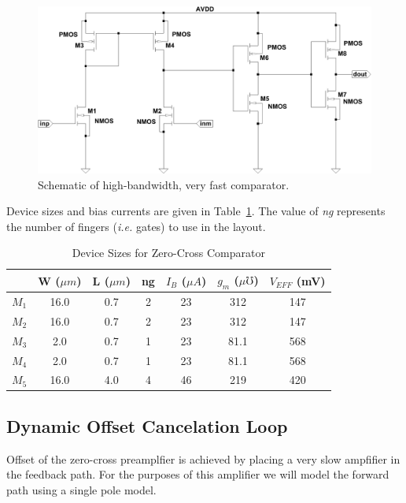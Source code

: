 \documentclass[12pt, onecolumn]{IEEEtran}
\begin{document}
\begin{figure}[htbp!]
	\centering
 	\includegraphics[scale=0.6,keepaspectratio=true]{./images/zc_cmp.pdf}
 	\caption{Schematic of high-bandwidth, very fast comparator.}
 	\label{FIG:ZC_CMP}
\end{figure}



Device sizes and bias currents are given in Table~\ref{TBL:ZC_CMP}. The value of \emph{ng} represents the number of fingers (\emph{i.e.} gates) to use in the layout.\\ 


\begin{table} [htbp!]
\begin{center}
\begin{tabular}{|c|c|c|c|c|c|c|}
\hline 
 & W ($\mu m$) & L ($\mu m$) & ng & $I_B$ ($\mu A$) & $g_m$ ($\mu \mho$) & $V_{EFF}$ (mV)\\ 
\hline 
$M_1$ & 16.0 & 0.7 & 2 & 23 & 312 & 147 \\ 
\hline 
$M_2$ & 16.0 & 0.7 & 2 & 23 & 312 & 147 \\ 
\hline 
$M_3$ & 2.0 & 0.7 & 1 & 23 & 81.1 & 568 \\ 
\hline 
$M_4$ & 2.0 & 0.7 & 1 & 23 & 81.1 & 568 \\ 
\hline 
$M_5$ & 16.0 & 4.0 & 4 & 46 & 219 & 420 \\ 
\hline 
\end{tabular} 
\end{center}
\caption{Device Sizes for Zero-Cross Comparator}
\label{TBL:ZC_CMP}
\end{table}


\subsection*{Dynamic Offset Cancelation Loop}


Offset of the zero-cross preamplfier is achieved by placing a very slow ampfifier in the feedback path.  For the purposes of this amplifier we will model the forward path using a single pole model.\\
\end{document}
